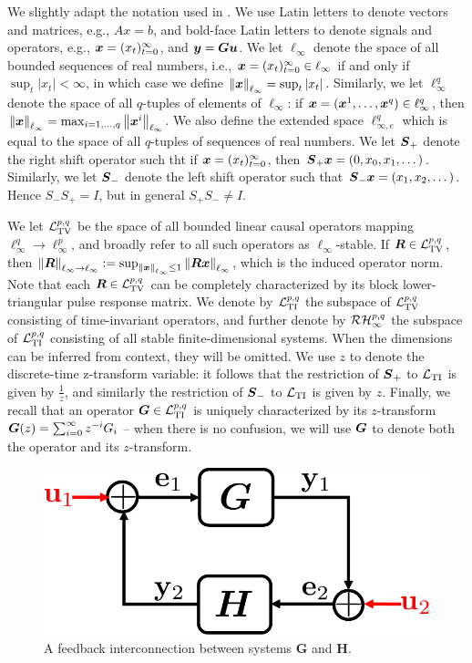 We slightly adapt the notation used in \cite{khammash1990stability}.  We use Latin letters to denote vectors and matrices, e.g., $Ax = b$, and bold-face Latin letters to denote signals and operators, e.g., $\boldsymbol{x} = (x_t)_{t=0}^\infty$, and $\boldsymbol{y} = \boldsymbol{G} \boldsymbol{u}$.  We let $\ell_\infty$ denote the space of all bounded sequences of real numbers, i.e., $\boldsymbol{x} = (x_t)_{t=0}^\infty \in \ell_\infty$ if and only if $\sup_t |x_t|<\infty$, in which case we define $\left\|\boldsymbol{x}\right\|_{\ell_\infty} = \sup_t |x_t|$.  Similarly, we let $\ell^q_\infty$ denote the space of all $q$-tuples of elements of $\ell_\infty$: if $\boldsymbol{x} = (\boldsymbol{x}^1, \dots, \boldsymbol{x}^q) \in \ell^q_\infty$, then $\left\|\boldsymbol{x}\right\|_{\ell_\infty} = \max_{i=1,\dots, q}\left\|\boldsymbol{x}^i\right\|_{\ell_\infty}$.  We also define the extended space $\ell^{q}_{\infty,e}$ which is equal to the space of all $q$-tuples of sequences of real numbers.  We let $\boldsymbol{S}_+$ denote the right shift operator such tht if $\boldsymbol{x} = (x_t)_{t=0}^\infty$, then $\boldsymbol{S}_+\boldsymbol{x} = (0,x_0, x_1, \dots)$.  Similarly, we let $\boldsymbol{S}_-$ denote the left shift operator such that $\boldsymbol{S}_- \boldsymbol{x} = (x_1,x_2, \dots)$.  Hence $S_-S_+ = I$, but in general $S_+ S_- \neq I$.  

We let $\mathcal{L}_{\mathrm{TV}}^{p,q}$ be the space of all bounded linear causal operators mapping $\ell^q_\infty \to \ell^p_\infty$, and broadly refer to all such operators as $\ell_\infty$-stable.  If $\boldsymbol{R} \in \mathcal{L}_{\mathrm{TV}}^{p,q}$, then $\left\|\boldsymbol{R}\right\|_{\ell_\infty\to\ell_\infty} := \sup_{\left\|\boldsymbol{x}\right\|_{\ell_\infty}\leq 1}\left\|\boldsymbol{R} \boldsymbol{x}\right\|_{\ell_\infty}$, which is the induced operator norm.  Note that each $\boldsymbol{R} \in \mathcal{L}_{\mathrm{TV}}^{p,q}$ can be completely characterized by its block lower-triangular pulse response matrix.  We denote by $\mathcal{L}_{\mathrm{TI}}^{p,q}$ the subspace of $\mathcal{L}_{\mathrm{TV}}^{p,q}$ consisting of time-invariant operators, and further denote by $\mathcal{RH}_\infty^{p,q}$ the subspace of $\mathcal{L}_{\mathrm{TI}}^{p,q}$ consisting of all stable finite-dimensional systems.  When the dimensions can be inferred from context, they will be omitted.  We use $z$ to denote the discrete-time z-transform variable: it follows that the restriction of $\boldsymbol{S}_+$ to $\mathcal{L}_{\mathrm{TI}}$ is given by $\frac{1}{z}$, and similarly the restriction of $\boldsymbol{S}_-$ to $\mathcal{L}_{\mathrm{TI}}$ is given by $z$.  Finally, we recall that an operator $\boldsymbol{G} \in \mathcal{L}_{\mathrm{TI}}^{p,q}$ is uniquely characterized by its $z$-transform $\boldsymbol{G}(z) = \sum_{i=0}^\infty z^{-i}G_i$ -- when there is no confusion, we will use $\boldsymbol{G}$ to denote both the operator and its $z$-transform.

\begin{figure}
\centering
\includegraphics[width=.4\columnwidth]{well-posed}
\caption{A feedback interconnection between systems $\mathbf{G}$ and $\mathbf{H}$.}
\label{fig:well-posed}
\end{figure}


